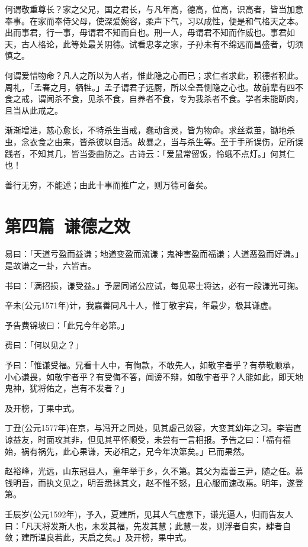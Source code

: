 \documentclass[12pt,twoside,openany]{book}
\begin{document}
何谓敬重尊长？家之父兄，国之君长，与凡年高，德高，位高，识高者，皆当加意奉事。在家而奉侍父母，使深爱婉容，柔声下气，习以成性，便是和气格天之本。出而事君，行一事，毋谓君不知而自也。刑一人，毋谓君不知而作威也。事君如天，古人格论，此等处最关阴德。试看忠孝之家，子孙未有不绵远而昌盛者，切须慎之。

何谓爱惜物命？凡人之所以为人者，惟此隐之心而已；求仁者求此，积德者积此。周礼，「孟春之月，牺牲。」孟子谓君子远厨，所以全吾恻隐之心也。故前辈有四不食之戒，谓闻杀不食，见杀不食，自养者不食，专为我杀者不食。学者未能断肉，且当从此戒之。

渐渐增进，慈心愈长，不特杀生当戒，蠢动含灵，皆为物命。求丝煮茧，锄地杀虫，念衣食之由来，皆杀彼以自活。故暴之，当与杀生等。至于手所误伤，足所误践者，不知其几，皆当委曲防之。古诗云：「爱鼠常留饭，怜蛾不点灯。」何其仁也！

善行无穷，不能述；由此十事而推广之，则万德可备矣。

\chapter{第四篇\ 谦德之效}

易曰：「天道亏盈而益谦；地道变盈而流谦；鬼神害盈而福谦；人道恶盈而好谦。」是故谦之一卦，六皆吉。

书曰：「满招损，谦受益。」予屡同诸公应试，每见寒士将达，必有一段谦光可掬。

辛未(公元1571年)计，我嘉善同凡十人，惟丁敬宇宾，年最少，极其谦虚。

予告费锦坡曰：「此兄今年必第。」

费曰：「何以见之？」

予曰：「惟谦受福。兄看十人中，有恂款，不敢先人，如敬宇者乎？有恭敬顺承，小心谦畏，如敬宇者乎？有受侮不答，闻谤不辩，如敬宇者乎？人能如此，即天地鬼神，犹将佑之，岂有不发者？」

及开榜，丁果中式。

丁丑(公元1577年)在京，与冯开之同处，见其虚己敛容，大变其幼年之习。李岩直谅益友，时面攻其非，但见其平怀顺受，未尝有一言相报。予告之曰：「福有福始，祸有祸先，此心果谦，天必相之，兄今年决第矣。」已而果然。

赵裕峰，光远，山东冠县人，童年举于乡，久不第。其父为嘉善三尹，随之任。慕钱明吾，而执文见之，明吾悉抹其文，赵不惟不怒，且心服而速改焉。明年，遂登第。

壬辰岁(公元1592年)，予入，夏建所，见其人气虚意下，谦光逼人，归而告友人曰：「凡天将发斯人也，未发其福，先发其慧；此慧一发，则浮者自实，肆者自敛；建所温良若此，天启之矣。」及开榜，果中式。
\end{document}
